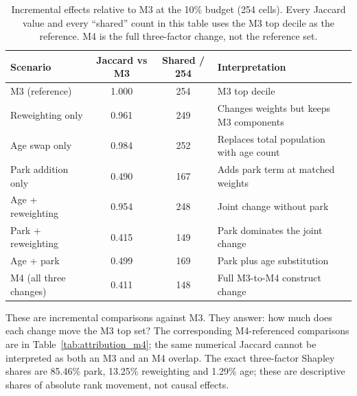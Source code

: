 \begin{table}[H]
\centering
\small
\caption{Incremental effects relative to M3 at the 10\% budget (254 cells). Every
Jaccard value and every ``shared'' count in this table uses the M3 top decile as
the reference. M4 is the full three-factor change, not the reference set.}
\label{tab:attribution_m3}
\begin{threeparttable}
\begin{tabularx}{\textwidth}{@{}>{\raggedright\arraybackslash}p{6.0cm} c c >{\raggedright\arraybackslash}X@{}}
\toprule
Scenario & Jaccard vs M3 & Shared / 254 & Interpretation \\
\midrule
M3 (reference) & 1.000 & 254 & M3 top decile \\
Reweighting only & 0.961 & 249 & Changes weights but keeps M3 components \\
Age swap only & 0.984 & 252 & Replaces total population with age count \\
Park addition only & 0.490 & 167 & Adds park term at matched weights \\
Age + reweighting & 0.954 & 248 & Joint change without park \\
Park + reweighting & 0.415 & 149 & Park dominates the joint change \\
Age + park & 0.499 & 169 & Park plus age substitution \\
M4 (all three changes) & 0.411 & 148 & Full M3-to-M4 construct change \\
\bottomrule
\end{tabularx}
\begin{tablenotes}[flushleft]\footnotesize
\item These are incremental comparisons against M3. They answer: how much does each change move the M3 top set? The corresponding M4-referenced comparisons are in Table~\ref{tab:attribution_m4}; the same numerical Jaccard cannot be interpreted as both an M3 and an M4 overlap. The exact three-factor Shapley shares are 85.46\% park, 13.25\% reweighting and 1.29\% age; these are descriptive shares of absolute rank movement, not causal effects.
\end{tablenotes}
\end{threeparttable}
\end{table}
